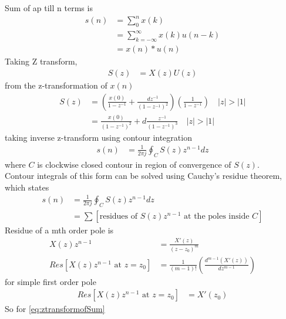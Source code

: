 \documentclass[journal,12pt,onecolumn]{IEEEtran}
\theoremstyle{remark}
\providecommand{\sbrak}[1]{\ensuremath{{}\left[#1\right]}}
\providecommand{\brak}[1]{\ensuremath{\left(#1\right)}}
\providecommand{\abs}[1]{\left\vert#1\right\vert}
\begin{document}
Sum of ap till n terms is
\begin{align}
    s\brak{n} & =\sum_{0}^{n} x\brak{k}                          \\
              & = \sum_{k=-\infty}^{\infty} x\brak{k}u\brak{n-k} \\
              & = x\brak{n} * u\brak{n}
\end{align}
Taking Z transform,
\begin{align}
    S\brak{z} & = X\brak{z}U\brak{z}
\end{align}
from the z-transformation of $x\brak{n}$
\begin{align}
    S\brak{z} & = \brak{\frac{x\brak{0}}{1-z^{-1}} + \frac{dz^{-1}}{\brak{1-z^{-1}}^2}}\brak{\frac{1}{1-z^{-1}}} \quad \abs{z} >\abs{1}     \\
              & = \frac{x\brak{0}}{\brak{1-z^{-1}}^2}+ d\frac{z^{-1}}{\brak{1-z^{-1}}^3} \quad \abs{z} > \abs{1} \label{eq:ztransformofSum}
\end{align}
taking inverse z-transform using contour integration
\begin{align}
    s\brak{n} & = \frac{1}{2\pi j} \oint_C S\brak{z} z^{n-1} dz
\end{align}
where $C$ is clockwise closed contour in region of convergence of $S\brak{z} $.\\
Contour integrals of this form can be solved using Cauchy's residue theorem, which states
\begin{align}
    s\brak{n} & = \frac{1}{2\pi j} \oint_C S\brak{z} z^{n-1} dz                                    \\
              & = \sum \sbrak{\text{residues of } S\brak{z}z^{n-1} \text{ at the poles inside } C}
\end{align}
Residue of a mth order pole is
\begin{align}
    X\brak{z}z^{n-1}                              & = \frac{X'\brak{z}}{\brak{z-z_0}^m}                                      \\
    Res\sbrak{X\brak{z}z^{n-1} \text{ at } z=z_0} & = \frac{1}{\brak{m-1}!} \brak{\frac{d^{m-1}\brak{X'\brak{z}}}{dz^{m-1}}}
\end{align}
for simple first order pole
\begin{align}
    Res\sbrak{X\brak{z}z^{n-1} \text{ at } z=z_0} & = X'\brak{z_0}
\end{align}
So for \eqref{eq:ztransformofSum}
\end{document}
